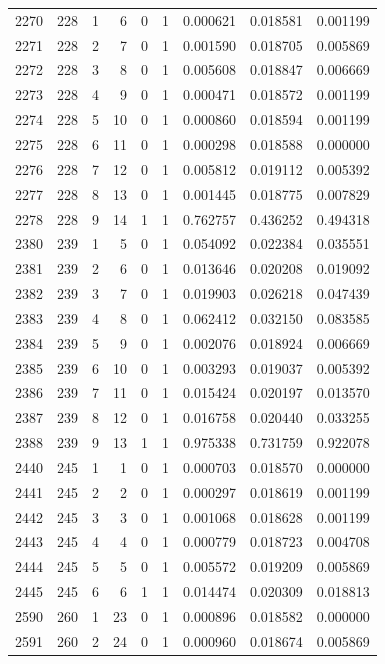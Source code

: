 \begin{longtable}{rrrrrrrrr}
2270 & 228 & 1 & 6 & 0 & 1 & 0.000621 & 0.018581 & 0.001199 \\
2271 & 228 & 2 & 7 & 0 & 1 & 0.001590 & 0.018705 & 0.005869 \\
2272 & 228 & 3 & 8 & 0 & 1 & 0.005608 & 0.018847 & 0.006669 \\
2273 & 228 & 4 & 9 & 0 & 1 & 0.000471 & 0.018572 & 0.001199 \\
2274 & 228 & 5 & 10 & 0 & 1 & 0.000860 & 0.018594 & 0.001199 \\
2275 & 228 & 6 & 11 & 0 & 1 & 0.000298 & 0.018588 & 0.000000 \\
2276 & 228 & 7 & 12 & 0 & 1 & 0.005812 & 0.019112 & 0.005392 \\
2277 & 228 & 8 & 13 & 0 & 1 & 0.001445 & 0.018775 & 0.007829 \\
2278 & 228 & 9 & 14 & 1 & 1 & 0.762757 & 0.436252 & 0.494318 \\
2380 & 239 & 1 & 5 & 0 & 1 & 0.054092 & 0.022384 & 0.035551 \\
2381 & 239 & 2 & 6 & 0 & 1 & 0.013646 & 0.020208 & 0.019092 \\
2382 & 239 & 3 & 7 & 0 & 1 & 0.019903 & 0.026218 & 0.047439 \\
2383 & 239 & 4 & 8 & 0 & 1 & 0.062412 & 0.032150 & 0.083585 \\
2384 & 239 & 5 & 9 & 0 & 1 & 0.002076 & 0.018924 & 0.006669 \\
2385 & 239 & 6 & 10 & 0 & 1 & 0.003293 & 0.019037 & 0.005392 \\
2386 & 239 & 7 & 11 & 0 & 1 & 0.015424 & 0.020197 & 0.013570 \\
2387 & 239 & 8 & 12 & 0 & 1 & 0.016758 & 0.020440 & 0.033255 \\
2388 & 239 & 9 & 13 & 1 & 1 & 0.975338 & 0.731759 & 0.922078 \\
2440 & 245 & 1 & 1 & 0 & 1 & 0.000703 & 0.018570 & 0.000000 \\
2441 & 245 & 2 & 2 & 0 & 1 & 0.000297 & 0.018619 & 0.001199 \\
2442 & 245 & 3 & 3 & 0 & 1 & 0.001068 & 0.018628 & 0.001199 \\
2443 & 245 & 4 & 4 & 0 & 1 & 0.000779 & 0.018723 & 0.004708 \\
2444 & 245 & 5 & 5 & 0 & 1 & 0.005572 & 0.019209 & 0.005869 \\
2445 & 245 & 6 & 6 & 1 & 1 & 0.014474 & 0.020309 & 0.018813 \\
2590 & 260 & 1 & 23 & 0 & 1 & 0.000896 & 0.018582 & 0.000000 \\
2591 & 260 & 2 & 24 & 0 & 1 & 0.000960 & 0.018674 & 0.005869 \\

\end{longtable}
